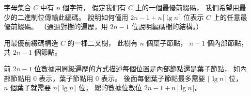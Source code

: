 \startEXERCISE
字母集合 $C$ 中有 $n$ 個字符，
假定我們有 $C$ 上的一個最優前綴碼，
我們希望用最少的二進制位傳輸此編碼。
說明如何僅用 $2n-1+n\lceil \lg n\rceil$ 位表示 $C$ 上的任意最優前綴碼。
（\hint 通過對樹的遍歷，用 $2n-1$ 位說明編碼樹的結構。）
\stopEXERCISE

\startANSWER
用最優前綴碼構造 $C$ 的一棵二叉樹，
此樹有 $n$ 個葉子節點， $n-1$ 個內部節點，
共 $2n-1$ 個節點。

前 $2n-1$ 位數據用層級遍歷的方式描述每個位置是內部節點還是葉子節點，
如內部節點用 $0$ 表示，葉子節點用 $0$ 表示。
後面每個葉子節點最多需要 $\lceil \lg n\rceil$ 位，
 $n$ 個葉子就需要 $n\lceil \lg n\rceil$ 位，
總的數據位數位 $2n-1 + n\lceil \lg n\rceil$。
\stopANSWER
